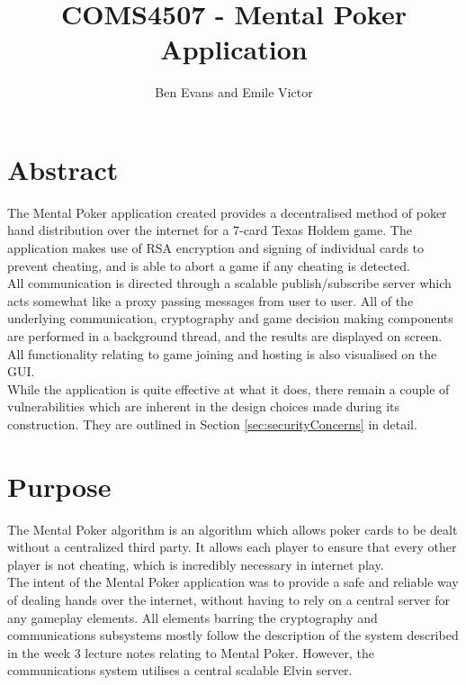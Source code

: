 \documentclass[11pt, oneside]{article}   	%
\title{COMS4507 - Mental Poker Application}
\author{Ben Evans and Emile Victor}
\begin{document}
\maketitle

\section{Abstract}

The Mental Poker application created provides a decentralised method of poker hand distribution over the internet for a 7-card Texas Holdem game. The application makes use of RSA encryption and signing of individual cards to prevent cheating, and is able to abort a game if any cheating is detected.\\
					
All communication is directed through a scalable publish/subscribe server which acts somewhat like a proxy passing messages from user to user. All of the underlying communication, cryptography and game decision making components are performed in a background thread, and the results are displayed on screen. All functionality relating to game joining and hosting is also visualised on the GUI.\\
					
While the application is quite effective at what it does, there remain a couple of vulnerabilities which are inherent in the design choices made during its construction. They are outlined in Section \ref{sec:securityConcerns} in detail.

\section {Purpose}

The Mental Poker algorithm is an algorithm which allows poker cards to be dealt without a centralized third party. It allows each player to ensure that every other player is not cheating, which is incredibly necessary in internet play. \\

The intent of the Mental Poker application was to provide a safe and reliable way of dealing hands over the internet, without having to rely on a central server for any gameplay elements. All elements barring the cryptography and communications subsystems mostly follow the description of the system described in the week 3 lecture notes relating to Mental Poker. However, the communications system utilises a central scalable Elvin server.
\end{document}

